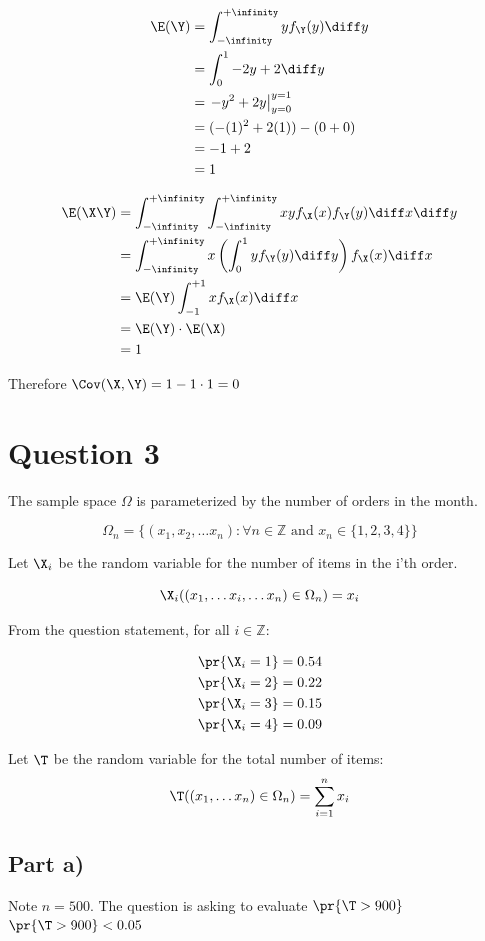 \begin{align*}
\E(\Y) &= \int_{-\infinity}^{+\infinity} yf_\Y(y) \diff y\\
&= \int _0 ^1 -2y + 2 \diff y \\
&= \left. -y^2 + 2y \right|^{y=1}_{y=0} \\
&= (-(1)^2 + 2(1)) - (0 + 0) \\
&= -1 + 2 \\
&= 1
\end{align*}


\begin{align*}
\E(\X\Y) &= \int _{-\infinity} ^{+\infinity} \int _{-\infinity} ^{+\infinity} xy f_\X(x)f_\Y(y) \diff x \diff y \\
&= \int _{-\infinity} ^{+\infinity} x\left(\int _0 ^1 y f_\Y(y)\diff y\right)f_\X(x) \diff x \\
&= \E(\Y) \int _{-1} ^{+1} x f_\X(x) \diff x \\
&= \E(\Y) \cdot \E(\X) \\
&= 1
\end{align*}

Therefore $\Cov(\X, \Y) = 1 - 1 \cdot 1 = 0$

\section{Question 3}

The sample space $\Omega$ is parameterized by the number of orders in the month.

\[
\Omega_n = \{ (x_1, x_2, \ldots x_n) : \forall n\in \mathbb{Z} \text{ and } x_n \in \{ 1, 2, 3, 4 \} \}
\]

Let $\X_i$ be the random variable for the number of items in the i'th order.

\[
\X_i((x_1, \ldots x_i, \ldots x_n) \in \Omega_n) = x_i
\]

From the question statement, for all $i \in \mathbb{Z}$:

\begin{align*}
\pr{\X_i = 1} &= 0.54 \\
\pr{\X_i = 2} &= 0.22 \\
\pr{\X_i = 3} &= 0.15 \\
\pr{\X_i = 4} &= 0.09
\end{align*}

Let $\T$ be the random variable for the total number of items:
\[
\T((x_1, \ldots x_n) \in \Omega_n) = \sum _{i=1} ^n x_i
\]

\subsection{Part a)}

Note $n = 500$. The question is asking to evaluate $\pr{\T > 900}$ $\pr{\T > 900} < 0.05$

